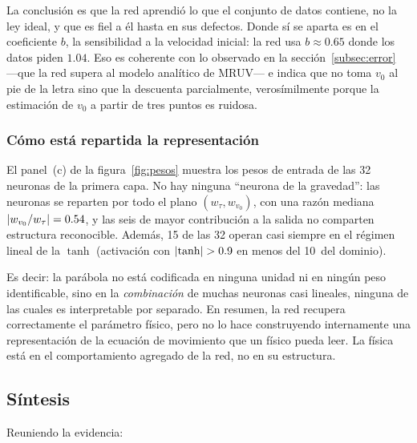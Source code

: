 \documentclass[titlepage,11pt]{article}
\providecommand{\num}[1]{\ensuremath{#1}}
\providecommand{\SI}[2]{#1\,#2}
\providecommand{\percent}{\char37\relax}
\begin{document}
La conclusión es que la red aprendió lo que el conjunto de datos contiene, no
la ley ideal, y que es fiel a él hasta en sus defectos. Donde sí se aparta es
en el coeficiente $b$, la sensibilidad a la velocidad inicial: la red usa
$b\approx\num{0.65}$ donde los datos piden $\num{1.04}$. Eso es coherente con
lo observado en la sección~\ref{subsec:error} ---que la red supera al modelo
analítico de MRUV--- e indica que no toma $v_0$ al pie de la letra sino que la
descuenta parcialmente, verosímilmente porque la estimación de $v_0$ a partir
de tres puntos es ruidosa.

\subsubsection{Cómo está repartida la representación}
\label{subsubsec:representacion}

El panel~(c) de la figura~\ref{fig:pesos} muestra los pesos de entrada de las
32 neuronas de la primera capa. No hay ninguna \enquote{neurona de la
gravedad}: las neuronas se reparten por todo el plano $(w_\tau, w_{v_0})$, con
una razón mediana $\abs{w_{v_0}/w_\tau}=\num{0.54}$, y las seis de mayor
contribución a la salida no comparten estructura reconocible. Además, 15 de las
32 operan casi siempre en el régimen lineal de la $\tanh$ (activación con
$\abs{\tanh}>0.9$ en menos del \SI{10}{\percent} del dominio).

Es decir: la parábola no está codificada en ninguna unidad ni en ningún peso
identificable, sino en la \emph{combinación} de muchas neuronas casi lineales,
ninguna de las cuales es interpretable por separado. En resumen, la red
recupera correctamente el
parámetro físico, pero no lo hace construyendo internamente una representación
de la ecuación de movimiento que un físico pueda leer. La física está en el
comportamiento agregado de la red, no en su estructura.

\subsection{Síntesis}

Reuniendo la evidencia:
\end{document}
